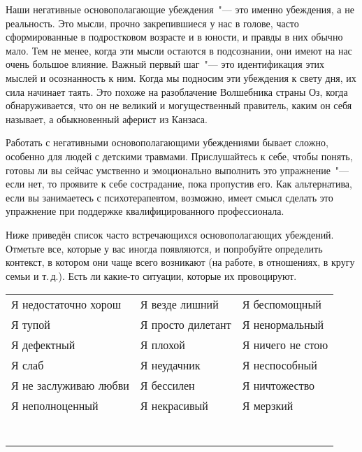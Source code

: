 \newpage
{} \label{Ex:Working_with_Our_Negative_Core_Beliefs}

Наши негативные основополагающие убеждения~"--- это именно убеждения, а не реальность. Это мысли, прочно закрепившиеся у нас в голове, часто сформированные в подростковом возрасте и в юности, и правды в них обычно мало. Тем не менее, когда эти мысли остаются в подсознании, они имеют на нас очень большое влияние. Важный первый шаг~"--- это идентификация этих мыслей и осознанность к ним. Когда мы подносим эти убеждения к свету дня, их сила начинает таять. Это похоже на разоблачение Волшебника страны Оз, когда обнаруживается, что он не великий и могущественный правитель, каким он себя называет, а обыкновенный аферист из Канзаса.

Работать с негативными основополагающими убеждениями бывает сложно, особенно для людей с детскими травмами. Прислушайтесь к себе, чтобы понять, готовы ли вы сейчас умственно и эмоционально выполнить это упражнение~"--- если нет, то проявите к себе сострадание, пока пропустив его. Как альтернатива, если вы занимаетесь с психотерапевтом, возможно, имеет смысл сделать это упражнение при поддержке квалифицированного профессионала.

\vspace{3ex}


\vspace{1ex}

Ниже приведён список часто встречающихся основополагающих убеждений. Отметьте все, которые у вас иногда появляются, и попробуйте определить контекст, в котором они чаще всего возникают (на работе, в отношениях, в кругу семьи и т.\,д.). Есть ли какие-то ситуации, которые их провоцируют.

\vspace{1ex}

\begin{center}
	\noindent\begin{tabular}{lll}
		Я недостаточно хорош & Я везде лишний & Я беспомощный \\
		Я тупой & Я просто дилетант & Я ненормальный \\
		Я дефектный & Я плохой & Я ничего не стою \\
		Я слаб & Я неудачник & Я неспособный \\
		Я не заслуживаю любви & Я бессилен & Я ничтожество \\
		Я неполноценный & Я некрасивый & Я мерзкий \\
		\\
		\\
		\arrayrulecolor{gray}\hline\\
		\hline\\
		\hline\\
		\hline\\
		\hline\\
	\end{tabular}
\end{center}

